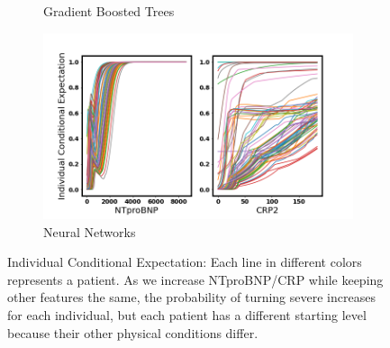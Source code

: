 \begin{figure}
\begin{subfigure}[b]{0.485\textwidth}
    \caption{Gradient Boosted Trees}
    \label{fig:gbt_ice}
\end{subfigure}
\hfill
\begin{subfigure}[b]{0.485\textwidth}
    \centering
    \includegraphics[width=\textwidth]{figures/chapter_interp/nn_ice_crp_ntproBNP.png}
    \caption{Neural Networks}
    \label{fig:nn_ice}
\end{subfigure}
\caption{Individual Conditional Expectation: Each line in different colors represents a patient. As we increase NTproBNP/CRP while keeping other features the same, the probability of turning severe increases for each individual, but each patient has a different starting level because their other physical conditions differ.}
\label{fig.ice}
\end{figure}



